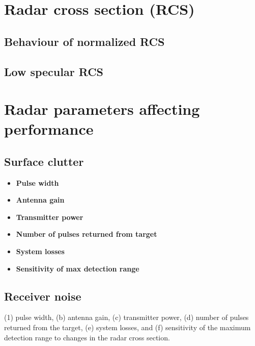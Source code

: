 \section{Radar cross section (RCS)}

\subsection{Behaviour of normalized RCS}

\subsection{Low specular RCS}


\section{Radar parameters affecting performance}

\subsection{Surface clutter}

\begin{itemize}
	\item \textbf{Pulse width}\newline
		
	\item \textbf{Antenna gain} \newline
	\item \textbf{Transmitter power}\newline
	\item \textbf{Number of pulses returned from target}\newline
	\item \textbf{System losses}\newline
	\item \textbf{Sensitivity of max detection range}
\end{itemize}


\subsection{Receiver noise}


(1) pulse width, (b) antenna gain, (c) transmitter power, (d) number of pulses returned from the target, (e) system losses, and (f) sensitivity of the maximum detection range to changes in the radar cross section.

